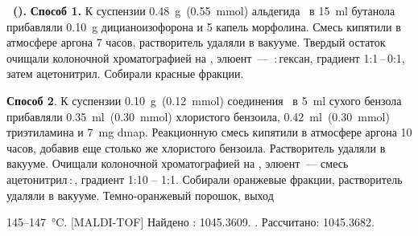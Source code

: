 
\textbf{~().} \textbf{Способ 1.} К суспензии \SI{0.48}{\gram}~(\SI{0.55}{\mmol}) альдегида~\textbf{} в \SI{15}{\milli\litre} бутанола прибавляли \SI{0.10}{\gram} дицианоизофорона и 5 капель морфолина. Смесь кипятили в атмосфере аргона 7 часов, растворитель удаляли в вакууме. Твердый остаток очищали колоночной хроматографией на , элюент~--- \,:\,гексан, градиент 1:1\,--\,0:1, затем ацетонитрил. Собирали красные фракции.

\textbf{Способ 2}.  К суспензии \SI{0.10}{\gram}~(\SI{0.12}{\mmol}) соединения~\textbf{} в \SI{5}{\milli\litre} сухого бензола прибавляли \SI{0.35}{\milli\litre}~(\SI{0.30}{\mmol}) хлористого бензоила, \SI{0.42}{\milli\litre}~(\SI{0.30}{\mmol}) триэтиламина и \SI{7}{\milli\gram} \ac{dmap}.
Реакционную смесь кипятили в атмосфере аргона 10 часов, добавив еще столько же хлористого бензоила.
Растворитель удаляли в вакууме. Очищали колоночной хроматографией на , элюент~--- смесь ацетонитрил\,:\,, градиент 1:10 -- 1:1.
Собирали оранжевые фракции, растворитель удаляли в вакууме. Темно-оранжевый порошок, выход
\begin{experimental}
     145--\SI{147}{\celsius}.
    [MALDI-TOF] Найдено \ce{[M + H]+}: \num{1045.3609}. . Рассчитано: \ce{[M + H]} \num{1045.3682}.
\end{experimental}

